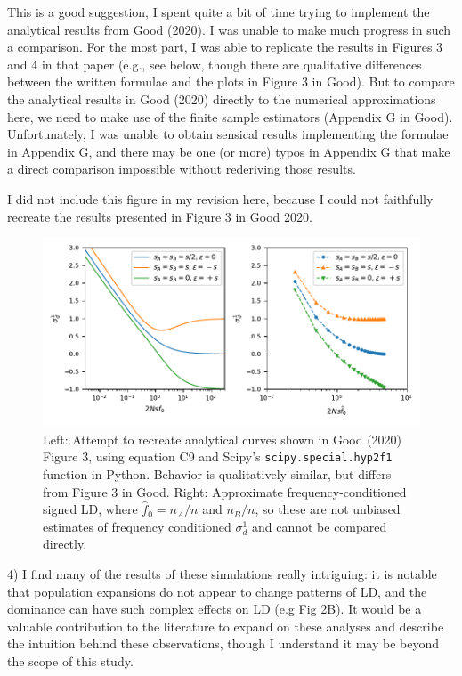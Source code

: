 \documentclass{article}
\newenvironment{response}%
  {\list{}{\leftmargin=0.5in\rightmargin=0.5in\color{blue}}\item[]}%
  {\endlist}
\begin{document}
\begin{response}
    This is a good suggestion, I spent quite a bit of time trying to implement
    the analytical results from Good (2020). I was unable to make much
    progress in such a comparison. For the most part, I was able to replicate
    the results in Figures 3 and 4 in that paper (e.g., see below, though there
    are qualitative differences between the written formulae and the plots in
    Figure 3 in Good).
    But to compare the analytical results in Good (2020) directly
    to the numerical approximations
    here, we need to make use of the finite sample estimators (Appendix G in Good).
    Unfortunately, I was unable to obtain sensical results implementing the
    formulae in Appendix G, and there may be one (or more) typos in Appendix G
    that make a direct comparison impossible without rederiving those results.

    I did not include this figure in my revision here, because I could not
    faithfully recreate the results presented in Figure 3 in Good 2020.
\end{response}

\begin{figure}[h!]
    \centering
    \includegraphics{./good_comparison}
    \caption{
        Left: Attempt to recreate analytical curves shown in Good (2020) Figure 3,
        using equation C9 and Scipy's \texttt{scipy.special.hyp2f1} function in Python.
        Behavior is qualitatively similar, but differs from Figure 3 in Good. 
        Right: Approximate frequency-conditioned signed LD, where
        $\hat{f}_0 = n_A/n$ and $n_B/n$, so these
        are not unbiased estimates of frequency conditioned $\sigma_d^1$ and cannot
        be compared directly.
    }
    \label{fig:good}
\end{figure}

4) I find many of the results of these simulations really intriguing: it is
notable that population expansions do not appear to change patterns of LD, and
the dominance can have such complex effects on LD (e.g Fig 2B). It would be a
valuable contribution to the literature to expand on these analyses and
describe the intuition behind these observations, though I understand it may be
beyond the scope of this study.
\end{document}
